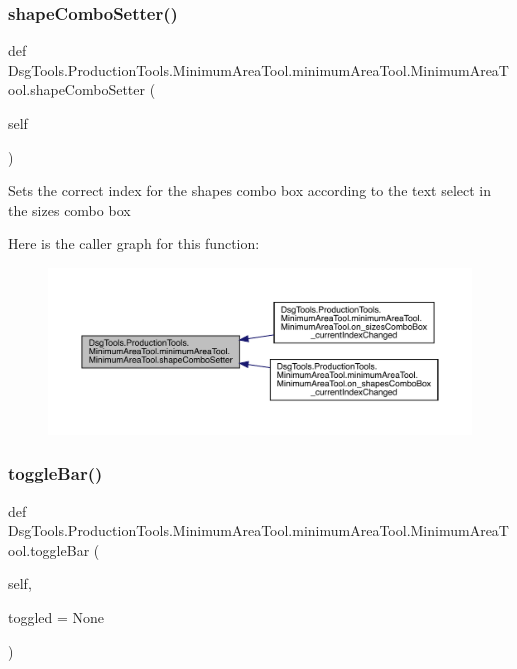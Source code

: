 \subsubsection{\texorpdfstring{shape\+Combo\+Setter()}{shapeComboSetter()}}
{\footnotesize\ttfamily def Dsg\+Tools.\+Production\+Tools.\+Minimum\+Area\+Tool.\+minimum\+Area\+Tool.\+Minimum\+Area\+Tool.\+shape\+Combo\+Setter (\begin{DoxyParamCaption}\item[{}]{self }\end{DoxyParamCaption})}

\begin{DoxyVerb}Sets the correct index for the shapes combo box according to the text select in the sizes combo box
\end{DoxyVerb}
 Here is the caller graph for this function\+:
\nopagebreak
\begin{figure}[H]
\begin{center}
\leavevmode
\includegraphics[width=350pt]{class_dsg_tools_1_1_production_tools_1_1_minimum_area_tool_1_1minimum_area_tool_1_1_minimum_area_tool_a9834d0ef71f8764d64fb8a2c524db0b4_icgraph}
\end{center}
\end{figure}
\mbox{\label{class_dsg_tools_1_1_production_tools_1_1_minimum_area_tool_1_1minimum_area_tool_1_1_minimum_area_tool_a1617ddd434f6bf1df70185d66d95e2c5}} 
\subsubsection{\texorpdfstring{toggle\+Bar()}{toggleBar()}}
{\footnotesize\ttfamily def Dsg\+Tools.\+Production\+Tools.\+Minimum\+Area\+Tool.\+minimum\+Area\+Tool.\+Minimum\+Area\+Tool.\+toggle\+Bar (\begin{DoxyParamCaption}\item[{}]{self,  }\item[{}]{toggled = {\ttfamily None} }\end{DoxyParamCaption})}

